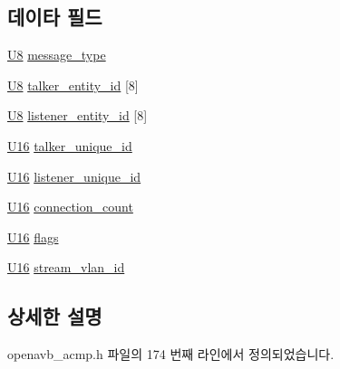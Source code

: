 \subsection*{데이타 필드}
\begin{DoxyCompactItemize}
\item 
\hyperlink{openavb__types__base__pub_8h_aa63ef7b996d5487ce35a5a66601f3e73}{U8} \hyperlink{structopenavb__acmp___a_c_m_p_command_params__t_a5e8953d77df4508aa07ed906c5b19beb}{message\+\_\+type}
\item 
\hyperlink{openavb__types__base__pub_8h_aa63ef7b996d5487ce35a5a66601f3e73}{U8} \hyperlink{structopenavb__acmp___a_c_m_p_command_params__t_a9a599b9c25c2171c3e76f269d9a04f51}{talker\+\_\+entity\+\_\+id} \mbox{[}8\mbox{]}
\item 
\hyperlink{openavb__types__base__pub_8h_aa63ef7b996d5487ce35a5a66601f3e73}{U8} \hyperlink{structopenavb__acmp___a_c_m_p_command_params__t_adc2799f499bfc317ee7d3a9182d1c71f}{listener\+\_\+entity\+\_\+id} \mbox{[}8\mbox{]}
\item 
\hyperlink{openavb__types__base__pub_8h_a0a0a322d5fa4a546d293a77ba8b4a71f}{U16} \hyperlink{structopenavb__acmp___a_c_m_p_command_params__t_a545e994bde6218210bb41265ac298837}{talker\+\_\+unique\+\_\+id}
\item 
\hyperlink{openavb__types__base__pub_8h_a0a0a322d5fa4a546d293a77ba8b4a71f}{U16} \hyperlink{structopenavb__acmp___a_c_m_p_command_params__t_adf094f0d101f97a77306253aa7c650e6}{listener\+\_\+unique\+\_\+id}
\item 
\hyperlink{openavb__types__base__pub_8h_a0a0a322d5fa4a546d293a77ba8b4a71f}{U16} \hyperlink{structopenavb__acmp___a_c_m_p_command_params__t_ad1ff24268593562ac5896a238d895b81}{connection\+\_\+count}
\item 
\hyperlink{openavb__types__base__pub_8h_a0a0a322d5fa4a546d293a77ba8b4a71f}{U16} \hyperlink{structopenavb__acmp___a_c_m_p_command_params__t_a492b33861e809623846e5256d271bc78}{flags}
\item 
\hyperlink{openavb__types__base__pub_8h_a0a0a322d5fa4a546d293a77ba8b4a71f}{U16} \hyperlink{structopenavb__acmp___a_c_m_p_command_params__t_a31db70d552fc6f5d35875430fca593e6}{stream\+\_\+vlan\+\_\+id}
\end{DoxyCompactItemize}


\subsection{상세한 설명}


openavb\+\_\+acmp.\+h 파일의 174 번째 라인에서 정의되었습니다.



